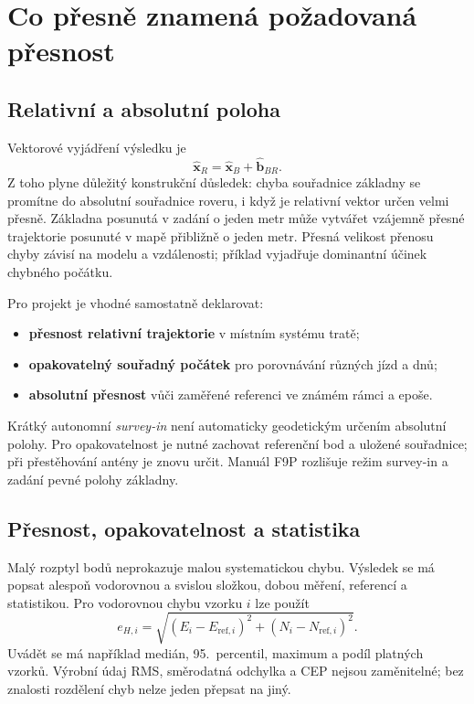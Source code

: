 \documentclass[11pt,a4paper]{article}
\begin{document}
\section{Co přesně znamená požadovaná přesnost}
\subsection{Relativní a absolutní poloha}
Vektorové vyjádření výsledku je
\begin{equation}
 \widehat{\mathbf x}_{R}=\widehat{\mathbf x}_{B}
                      +\widehat{\mathbf b}_{BR}.
\end{equation}
Z toho plyne důležitý konstrukční důsledek: chyba souřadnice základny se promítne do absolutní souřadnice roveru, i když je relativní vektor určen velmi přesně. Základna posunutá v zadání o jeden metr může vytvářet vzájemně přesné trajektorie posunuté v mapě přibližně o jeden metr. Přesná velikost přenosu chyby závisí na modelu a vzdálenosti; příklad vyjadřuje dominantní účinek chybného počátku.

Pro projekt je vhodné samostatně deklarovat:
\begin{itemize}
\item \textbf{přesnost relativní trajektorie} v místním systému tratě;
\item \textbf{opakovatelný souřadný počátek} pro porovnávání různých jízd a dnů;
\item \textbf{absolutní přesnost} vůči zaměřené referenci ve známém rámci a epoše.
\end{itemize}
Krátký autonomní \emph{survey-in} není automaticky geodetickým určením absolutní polohy. Pro opakovatelnost je nutné zachovat referenční bod a uložené souřadnice; při přestěhování antény je znovu určit. Manuál F9P rozlišuje režim survey-in a zadání pevné polohy základny.\cite{f9p}

\subsection{Přesnost, opakovatelnost a statistika}
Malý rozptyl bodů neprokazuje malou systematickou chybu. Výsledek se má popsat alespoň vodorovnou a svislou složkou, dobou měření, referencí a statistikou. Pro vodorovnou chybu vzorku $i$ lze použít
\begin{equation}
 e_{H,i}=\sqrt{(E_i-E_{\mathrm{ref},i})^2+
                   (N_i-N_{\mathrm{ref},i})^2}.
\end{equation}
Uvádět se má například medián, 95.~percentil, maximum a podíl platných vzorků. Výrobní údaj RMS, směrodatná odchylka a CEP nejsou zaměnitelné; bez znalosti rozdělení chyb nelze jeden přepsat na jiný.
\end{document}
